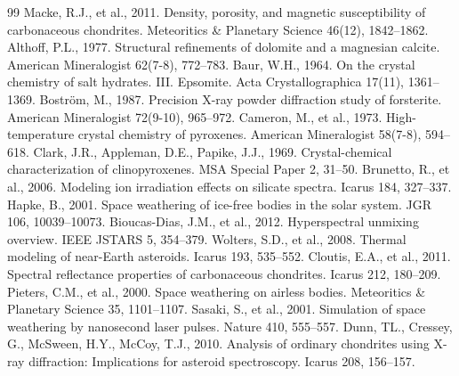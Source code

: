 \documentclass[11pt,a4paper]{article}
\begin{document}
\begin{thebibliography}{99}
 Macke, R.J., et al., 2011. Density, porosity, and magnetic susceptibility of carbonaceous chondrites. Meteoritics \& Planetary Science 46(12), 1842--1862.
 Althoff, P.L., 1977. Structural refinements of dolomite and a magnesian calcite. American Mineralogist 62(7-8), 772--783.
 Baur, W.H., 1964. On the crystal chemistry of salt hydrates. III. Epsomite. Acta Crystallographica 17(11), 1361--1369.
 Boström, M., 1987. Precision X-ray powder diffraction study of forsterite. American Mineralogist 72(9-10), 965--972.
 Cameron, M., et al., 1973. High-temperature crystal chemistry of pyroxenes. American Mineralogist 58(7-8), 594--618.
 Clark, J.R., Appleman, D.E., Papike, J.J., 1969. Crystal-chemical characterization of clinopyroxenes. MSA Special Paper 2, 31--50.
 Brunetto, R., et al., 2006. Modeling ion irradiation effects on silicate spectra. Icarus 184, 327--337.
 Hapke, B., 2001. Space weathering of ice-free bodies in the solar system. JGR 106, 10039--10073.
 Bioucas-Dias, J.M., et al., 2012. Hyperspectral unmixing overview. IEEE JSTARS 5, 354--379.
 Wolters, S.D., et al., 2008. Thermal modeling of near-Earth asteroids. Icarus 193, 535--552.
 Cloutis, E.A., et al., 2011. Spectral reflectance properties of carbonaceous chondrites. Icarus 212, 180--209.
 Pieters, C.M., et al., 2000. Space weathering on airless bodies. Meteoritics \& Planetary Science 35, 1101--1107.
 Sasaki, S., et al., 2001. Simulation of space weathering by nanosecond laser pulses. Nature 410, 555--557.
 Dunn, TL., Cressey, G., McSween, H.Y., McCoy, T.J., 2010. Analysis of ordinary chondrites using X-ray diffraction: Implications for asteroid spectroscopy. Icarus 208, 156--157.
\end{thebibliography}
\end{document}
